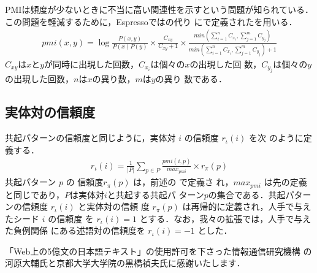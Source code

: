 \documentclass[japanese]{jnlp_1.4}
\begin{document}
PMIは頻度が少ないときに不当に高い関連性を示すという問題が知られている．
この問題を軽減するために，Espressoではの代り
に\cite{pantel2004}で定義されたを用いる．
\begin{eqnarray}
  \label{eq:pmi2}
  \mathit{pmi}(x, y) = \log\frac{P(x,y)}{P(x)P(y)} \times
  \frac{C_{xy}}{C_{xy}+1} \times
  \frac{min(\sum_{i=1}^{n}C_{x_i},\sum_{j=1}^{m}C_{y_j})}{min(\sum_{i=1}^{n}C_{x_i},\sum_{j=1}^{m}C_{y_j})
  + 1}
\end{eqnarray}
$C_{xy}$は$x$と$y$が同時に出現した回数，$C_{x_i}$は個々の$x$の出現した回
数，$C_{y_j}$は個々の$y$の出現した回数，$n$は$x$の異り数，$m$は$y$の異り
数である．


\subsection{実体対の信頼度}
共起パターンの信頼度と同じように，実体対 $i$ の信頼度 $r_\iota(i)$ を次
のように定義する．
\begin{eqnarray}
  \label{eq:rl}
  r_\iota(i) = 
    \frac{1}{|P|}
    \sum_{p \in P}
      \frac{\mathit{pmi}(i,p)}{\mathit{max}_{pmi}}
      \times r_\pi(p)  
\end{eqnarray}
共起パターン $p$ の 信頼度$r_\pi(p)$ は，前述の  で定義さ
れ，$max_{pmi}$ は先の定義と同じであり，$P$は実体対$i$と共起する共起パ
ターン$p$の集合である．共起パターンの信頼度 $r_\iota(i)$ と実体対の信頼
度 $r_\pi(p)$ は再帰的に定義され，人手で与えたシード $i$ の信頼度
を $r_\iota(i) = 1$ とする．なお，我々の拡張では，人手で与えた負例関係
にある述語対の信頼度を $r_\iota(i) = -1$ とした．

\acknowledgment
「Web上の5億文の日本語テキスト」の使用許可を下さった情報通信研究機構
の河原大輔氏と京都大学大学院の黒橋禎夫氏に感謝いたします．
\end{document}
